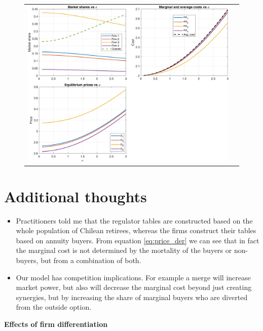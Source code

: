 \documentclass[12pt]{article}
\theoremstyle{plain}
\theoremstyle{plain}
\begin{document}
\begin{figure}[H]
\caption{}
 \label{fig:sigma}
\centering{}%
\begin{tabular}{cc}
\includegraphics[scale=1.4]{figures/simulations/sigma_panels.png} 
\end{tabular}
\end{figure}





 
 

\section{Additional thoughts}

\begin{itemize}
    \item Practitioners told me that the regulator tables are constructed based on the whole population of Chilean retirees, whereas the firms construct their tables based on annuity buyers. From equation \ref{eq:price_der} we can see that in fact the marginal cost is not determined by the mortality of the buyers or non-buyers, but from a combination of both. 

    \item Our model has competition implications. For example a merge will increase market power, but also will decrease the marginal cost beyond just creating synergies, but by increasing the share of marginal buyers who are diverted from the outside option. 
\end{itemize}


\textbf{Effects of firm differentiation}
\end{document}
